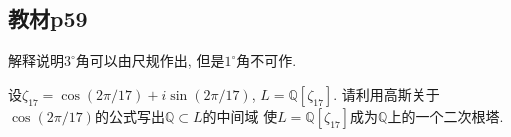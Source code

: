 \subsection{教材p59}

\begin{problem}
    解释说明$3^\circ$角可以由尺规作出, 但是$1^\circ$角不可作.
\end{problem}

\begin{solution}
    
\end{solution}

\begin{problem}
    设$\zeta_{17} = \cos(2\pi/17) + i\sin(2\pi/17)$,
$L = \mathbb{Q}[\zeta_{17}]$. 请利用高斯关于
$\cos(2\pi/17)$的公式写出$\mathbb{Q} \subset L$的中间域
使$L = \mathbb{Q}[\zeta_{17}]$成为$\mathbb{Q}$上的一个二次根塔.
\end{problem}

\begin{solution}
    
\end{solution}